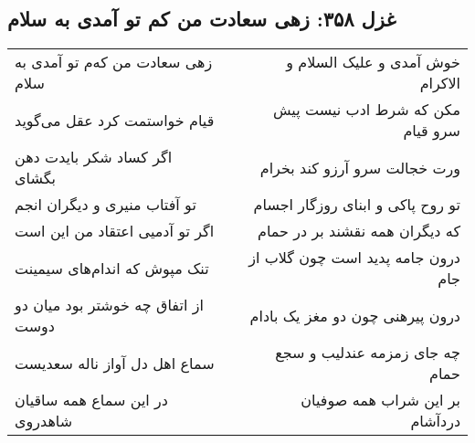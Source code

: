 \begin{center}
\section*{غزل ۳۵۸: زهی سعادت من کم تو آمدی به سلام}
\label{sec:358}
\begin{longtable}{l p{0.5cm} r}
زهی سعادت من که‌م تو آمدی به سلام
&&
خوش آمدی و علیک السلام و الاکرام
\\
قیام خواستمت کرد عقل می‌گوید
&&
مکن که شرط ادب نیست پیش سرو قیام
\\
اگر کساد شکر بایدت دهن بگشای
&&
ورت خجالت سرو آرزو کند بخرام
\\
تو آفتاب منیری و دیگران انجم
&&
تو روح پاکی و ابنای روزگار اجسام
\\
اگر تو آدمیی اعتقاد من این است
&&
که دیگران همه نقشند بر در حمام
\\
تنک مپوش که اندام‌های سیمینت
&&
درون جامه پدید است چون گلاب از جام
\\
از اتفاق چه خوشتر بود میان دو دوست
&&
درون پیرهنی چون دو مغز یک بادام
\\
سماع اهل دل آواز ناله سعدیست
&&
چه جای زمزمه عندلیب و سجع حمام
\\
در این سماع همه ساقیان شاهدروی
&&
بر این شراب همه صوفیان دردآشام
\\
\end{longtable}
\end{center}
